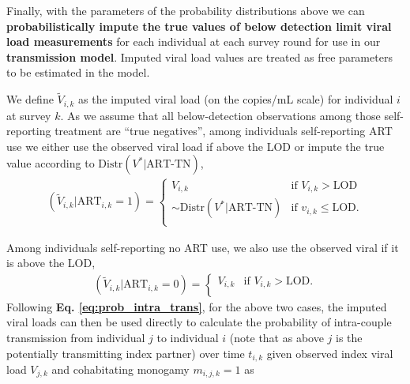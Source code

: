 \documentclass{article}[11pt]
\begin{document}


Finally, with the parameters of the probability distributions above we can \textbf{probabilistically impute the true values of below detection limit viral load measurements} for each individual at each survey round for use in our \textbf{transmission model}. Imputed viral load values are treated as free parameters to be estimated in the model. 

We define $\tilde{V}_{i,k}$ as the imputed viral load (on the copies/mL scale) for individual $i$ at survey $k$. As we assume that all below-detection observations among those self-reporting treatment are ``true negatives'', among individuals self-reporting ART use we either use the observed viral load if above the LOD or impute the true value according to $\text{Distr}(V^*|\text{ART-TN})$,
\begin{align}
(\tilde{V}_{i,k}|\text{ART}_{i,k}=1) = \begin{cases} 
    V_{i,k} & \text{if } V_{i,k} > \text{LOD} \\
    \sim\text{Distr}(V^*|\text{ART-TN}) & \text{if } v_{i,k} \leq \text{LOD}. \\
\end{cases}
\end{align}

Among individuals self-reporting no ART use, we also use the observed viral if it is above the LOD,
\begin{align}
(\tilde{V}_{i,k}|\text{ART}_{i,k}=0) = \begin{cases} 
    V_{i,k} & \text{if } V_{i,k} > \text{LOD}. \\
\end{cases}
\end{align}
Following \textbf{Eq. \ref{eq:prob_intra_trans}}, for the above two cases, the imputed viral loads can then be used directly to calculate the probability of intra-couple transmission from individual $j$ to individual $i$ (note that as above $j$ is the potentially transmitting index partner) over time $t_{i,k}$ given observed index viral load $V_{j,k}$ and cohabitating monogamy $m_{i,j,k}=1$ as
\end{document}

